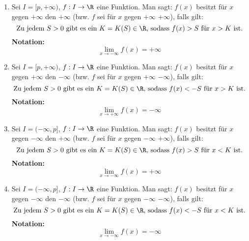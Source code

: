 \begin{enumerate}
    \item Sei $I = [p, +\infty)$, $f: I \to \R$ eine Funktion. Man sagt: $f(x)$ besitzt für $x$ gegen $+\infty$ den  $+\infty$ (bzw. $f$ sei für $x$ gegen $+\infty$  $+\infty$), falls gilt: $$\text{Zu jedem $S > 0$ gibt es ein $K = K(S) \in \R$, sodass $f(x) > S$ für $x > K$ ist.}$$ \textbf{Notation:} $$\lim_{x \to -\infty} f(x) = +\infty$$
    \item Sei $I = [p, +\infty)$, $f: I \to \R$ eine Funktion. Man sagt: $f(x)$ besitzt für $x$ gegen $+\infty$ den  $-\infty$ (bzw. $f$ sei für $x$ gegen $+\infty$  $-\infty$), falls gilt: $$\text{Zu jedem $S > 0$ gibt es ein $K = K(S) \in \R$, sodass $f(x) < -S$ für $x > K$ ist.}$$ \textbf{Notation:} $$\lim_{x \to +\infty} f(x) = -\infty$$
    \item Sei $I = (-\infty, p]$, $f: I \to \R$ eine Funktion. Man sagt: $f(x)$ besitzt für $x$ gegen $-\infty$ den  $+\infty$ (bzw. $f$ sei für $x$ gegen $-\infty$  $+\infty$), falls gilt: $$\text{Zu jedem $S > 0$ gibt es ein $K = K(S) \in \R$, sodass $f(x) > S$ für $x < K$ ist.}$$ \textbf{Notation:} $$\lim_{x \to -\infty} f(x) = +\infty$$
    \item Sei $I = (-\infty, p]$, $f: I \to \R$ eine Funktion. Man sagt: $f(x)$ besitzt für $x$ gegen $-\infty$ den  $-\infty$ (bzw. $f$ sei für $x$ gegen $-\infty$  $-\infty$), falls gilt: $$\text{Zu jedem $S > 0$ gibt es ein $K = K(S) \in \R$, sodass $f(x) < -S$ für $x < K$ ist.}$$ \textbf{Notation:} $$\lim_{x \to -\infty} f(x) = -\infty$$
\end{enumerate}